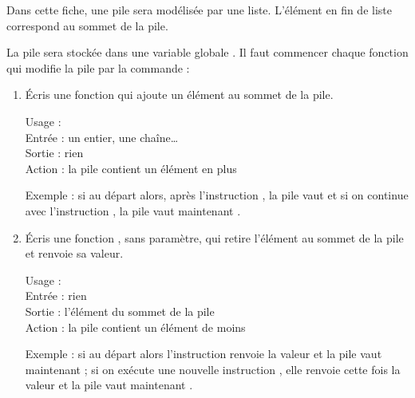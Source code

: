 \documentclass[11pt,class=report,crop=false]{standalone}
\begin{document}
\begin{activite}


Dans cette fiche, une pile sera modélisée par une liste. L'élément en fin de liste correspond au sommet de la pile.


La pile sera stockée dans une variable globale . 
Il faut commencer chaque fonction qui modifie la pile par la commande : 


\begin{enumerate}
  \item Écris une fonction  qui ajoute un élément au sommet de la pile.
  
  \begin{fonction}[\ci{empile()}]
  Usage :  \\
  Entrée : un entier, une chaîne\ldots \\
  Sortie : rien \\
  Action : la pile contient un élément en plus
  
  \medskip
    
  Exemple : si au départ  alors, après l'instruction , la pile vaut \ci{[5,1,3,8]} et si on continue avec l'instruction
, la pile vaut maintenant \ci{[5,1,3,8,6]}.     
  \end{fonction}

  \item Écris une fonction , sans paramètre, qui retire l'élément au sommet de la pile et renvoie sa valeur.
  
  \begin{fonction}[\ci{depile()}]
  Usage :  \\
  Entrée : rien \\
  Sortie : l'élément du sommet de la pile \\
  Action : la pile contient un élément de moins
  
  \medskip
    
  Exemple : si au départ  alors l'instruction  renvoie la valeur  et la pile vaut maintenant \ci{[13,4]} ; si on exécute une nouvelle instruction , elle renvoie cette fois la valeur  et la pile vaut maintenant \ci{[13]}.
  \end{fonction}
  

\end{enumerate}
\end{activite}
\end{document}
